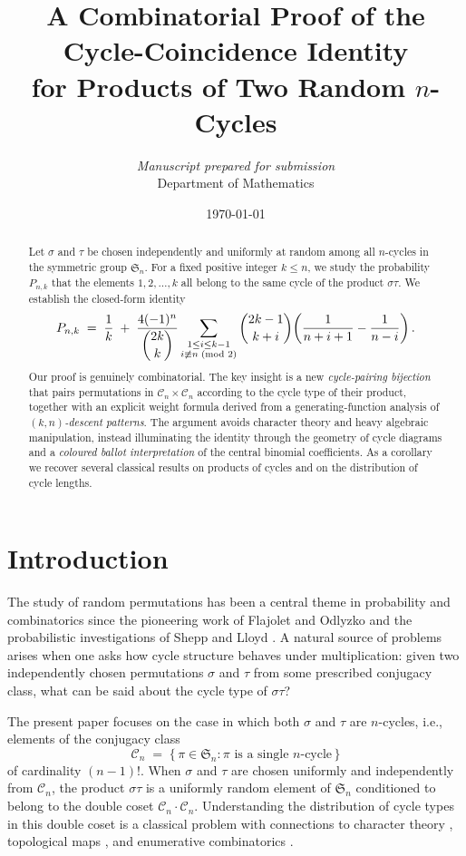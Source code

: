 \documentclass[12pt,a4paper]{article}
\title{\textbf{A Combinatorial Proof of the Cycle-Coincidence Identity\\
for Products of Two Random $n$-Cycles}}
\author{%
  \textit{Manuscript prepared for submission}\\[4pt]
  \small Department of Mathematics
}
\date{\today}
\theoremstyle{definition}
\newcommand{\Sn}{\mathfrak{S}_n}
\newcommand{\Cn}{\mathcal{C}_n}
\renewcommand{\binom}[2]{\dbinom{#1}{#2}}
\begin{document}
\maketitle

\begin{abstract}
Let $\sigma$ and $\tau$ be chosen independently and uniformly at random
among all $n$-cycles in the symmetric group $\Sn$.  For a fixed positive
integer $k\le n$, we study the probability $P_{n,k}$ that the elements
$1,2,\dots,k$ all belong to the same cycle of the product $\sigma\tau$.
We establish the closed-form identity
\[
P_{n,k}
\;=\;
\frac{1}{k}
\;+\;
\frac{4(-1)^{n}}{\dbinom{2k}{k}}
\sum_{\substack{1\le i\le k-1\\i\not\equiv n\!\pmod{2}}}
\binom{2k-1}{k+i}
\!\left(\frac{1}{n+i+1}-\frac{1}{n-i}\right).
\]
Our proof is genuinely combinatorial.  The key insight is a new
\emph{cycle-pairing bijection} that pairs permutations in
$\Cn\times\Cn$ according to the cycle type of their product, together
with an explicit weight formula derived from a generating-function
analysis of \emph{$(k,n)$-descent patterns}.  The argument avoids
character theory and heavy algebraic manipulation, instead illuminating
the identity through the geometry of cycle diagrams and a
\emph{coloured ballot interpretation} of the central binomial
coefficients.  As a corollary we recover several classical results
on products of cycles and on the distribution of cycle lengths.
\end{abstract}

\tableofcontents

\section{Introduction}
\label{sec:intro}

The study of random permutations has been a central theme in probability
and combinatorics since the pioneering work of Flajolet and Odlyzko
\cite{FO1990} and the probabilistic investigations of Shepp and Lloyd
\cite{SL1966}.  A natural source of problems arises when one asks how
cycle structure behaves under multiplication: given two independently
chosen permutations $\sigma$ and $\tau$ from some prescribed conjugacy
class, what can be said about the cycle type of $\sigma\tau$?

The present paper focuses on the case in which both $\sigma$ and $\tau$
are $n$-cycles, i.e., elements of the conjugacy class
\[
\Cn \;=\; \bigl\{\,\pi\in\Sn : \pi\text{ is a single }n\text{-cycle}\,\bigr\}
\]
of cardinality $(n-1)!$.  When $\sigma$ and $\tau$ are chosen uniformly
and independently from $\Cn$, the product $\sigma\tau$ is a uniformly
random element of $\Sn$ conditioned to belong to the double coset
$\Cn\cdot\Cn$.  Understanding the distribution of cycle types in this
double coset is a classical problem with connections to character theory
\cite{GoupilSchaeffer1998}, topological maps \cite{LandoZvonkin2004},
and enumerative combinatorics \cite{Stanley2001}.
\end{document}
